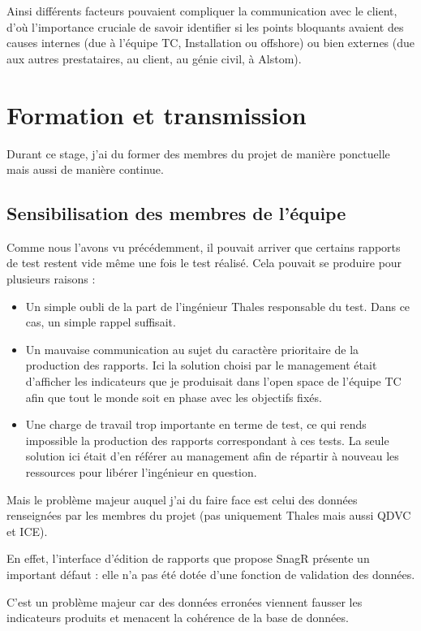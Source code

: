 Ainsi différents facteurs pouvaient compliquer la communication avec le client, d'où l'importance cruciale de savoir identifier si les points bloquants avaient des causes internes (due à l'équipe \gls{TC}, Installation ou offshore) ou bien externes (due aux autres prestataires, au client, au génie civil, à Alstom).


\newpage
\section{Formation et transmission}

Durant ce stage, j'ai du former des membres du projet de manière ponctuelle mais aussi de manière continue.
\subsection{Sensibilisation des membres de l'équipe }


Comme nous l'avons vu précédemment, il pouvait arriver que certains rapports de test restent vide même une fois le test réalisé. Cela pouvait se produire pour plusieurs raisons : 
\begin{itemize}
\item Un simple oubli de la part de l'ingénieur Thales responsable du test. Dans ce cas, un simple rappel suffisait.
\item Un mauvaise communication au sujet du caractère prioritaire de la production des rapports. Ici la solution choisi par le management était d'afficher les indicateurs que je produisait dans l'open space de l'équipe \gls{TC} afin que tout le monde soit en phase avec les objectifs fixés.
\item Une charge de travail trop importante en terme de test, ce qui rends impossible la production des rapports correspondant à ces tests. La seule solution ici était d'en référer au management afin de répartir à nouveau les ressources pour libérer l'ingénieur en question.
\end{itemize}

Mais le problème majeur auquel j'ai du faire face est celui des données renseignées par les membres du projet (pas uniquement Thales mais aussi QDVC et ICE).

En effet, l'interface d'édition de rapports que propose \gls{SnagR} présente un important défaut : elle n'a pas été dotée d'une fonction de validation des données.

C'est un problème majeur car des données erronées viennent fausser les indicateurs produits et menacent la cohérence de la base de données.


